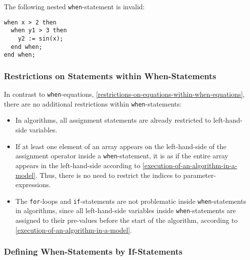 \begin{example}
The following nested \lstinline!when!-statement is invalid:
\begin{lstlisting}[language=modelica]
when x > 2 then
  when y1 > 3 then
    y2 := sin(x);
  end when;
end when;
\end{lstlisting}
\end{example}

\subsubsection{Restrictions on Statements within When-Statements}\label{restrictions-on-statements-within-when-statements}

\begin{nonnormative}
In contrast to \lstinline!when!-equations, \cref{restrictions-on-equations-within-when-equations}, there are no additional restrictions within \lstinline!when!-statements:
\begin{itemize}
\item
  In algorithms, all assignment statements are already restricted to left-hand-side variables.
\item
  If at least one element of an array appears on the left-hand-side of the assignment operator inside a \lstinline!when!-statement, it is as if the entire array appears in the left-hand-side according to \cref{execution-of-an-algorithm-in-a-model}.
  Thus, there is no need to restrict the indices to parameter-expressions.
\item
  The \lstinline!for!-loops and \lstinline!if!-statements are not problematic inside \lstinline!when!-statements in algorithms, since all left-hand-side variables inside \lstinline!when!-statements are assigned to their pre-values before the start of the algorithm, according to \cref{execution-of-an-algorithm-in-a-model}.
\end{itemize}
\end{nonnormative}

\subsubsection{Defining When-Statements by If-Statements}\label{defining-when-statements-by-if-statements}

